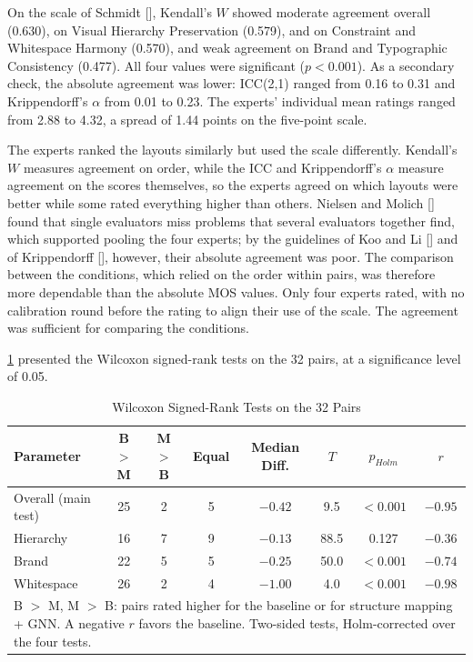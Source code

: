 \begin{refsection}
On the scale of Schmidt [\citeyear{schmidt1997managing}], Kendall's $W$ showed moderate agreement overall (0.630), on Visual Hierarchy Preservation (0.579), and on Constraint and Whitespace Harmony (0.570), and weak agreement on Brand and Typographic Consistency (0.477). All four values were significant ($p < 0.001$). As a secondary check, the absolute agreement was lower: ICC(2,1) ranged from 0.16 to 0.31 and Krippendorff's $\alpha$ from 0.01 to 0.23. The experts' individual mean ratings ranged from 2.88 to 4.32, a spread of 1.44 points on the five-point scale.

The experts ranked the layouts similarly but used the scale differently. Kendall's $W$ measures agreement on order, while the ICC and Krippendorff's $\alpha$ measure agreement on the scores themselves, so the experts agreed on which layouts were better while some rated everything higher than others. Nielsen and Molich [\citeyear{nielsen1990heuristic}] found that single evaluators miss problems that several evaluators together find, which supported pooling the four experts; by the guidelines of Koo and Li [\citeyear{koo2016guideline}] and of Krippendorff [\citeyear{krippendorff2004content}], however, their absolute agreement was poor. The comparison between the conditions, which relied on the order within pairs, was therefore more dependable than the absolute MOS values. Only four experts rated, with no calibration round before the rating to align their use of the scale. The agreement was sufficient for comparing the conditions.

\clearpage
\ref{tab:wilcoxon} presented the Wilcoxon signed-rank tests on the 32 pairs, at a significance level of 0.05.

\begin{table}[!ht]
\centering
\caption{Wilcoxon Signed-Rank Tests on the 32 Pairs}
\label{tab:wilcoxon}
\setlength{\tabcolsep}{4pt}
\begin{tabular}{l c c c c c c c}
\hline
\textbf{Parameter} & \textbf{B $>$ M} & \textbf{M $>$ B} & \textbf{Equal} & \textbf{Median Diff.} & \textbf{$T$} & \textbf{$p_{Holm}$} & \textbf{$r$} \\ \hline
Overall (main test) & 25 & 2 & 5 & $-0.42$ & 9.5 & $< 0.001$ & $-0.95$ \\
Hierarchy & 16 & 7 & 9 & $-0.13$ & 88.5 & 0.127 & $-0.36$ \\
Brand & 22 & 5 & 5 & $-0.25$ & 50.0 & $< 0.001$ & $-0.74$ \\
Whitespace & 26 & 2 & 4 & $-1.00$ & 4.0 & $< 0.001$ & $-0.98$ \\ \hline
\multicolumn{8}{p{0.92\textwidth}}{\footnotesize B $>$ M, M $>$ B: pairs rated higher for the baseline or for structure mapping + GNN. A negative $r$ favors the baseline. Two-sided tests, Holm-corrected over the four tests.}
\end{tabular}
\end{table}


\end{refsection}
